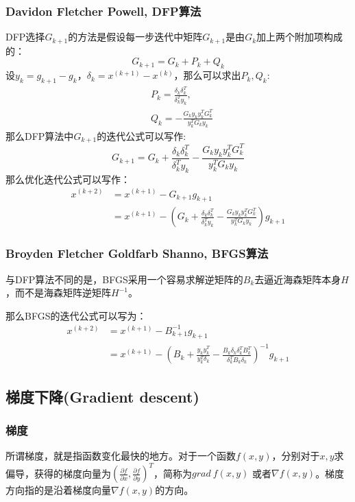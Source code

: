 \documentclass[11pt]{report}
\begin{document}
\subsubsection{Davidon Fletcher Powell, DFP算法}
DFP选择$G_{k+1}$的方法是假设每一步迭代中矩阵$G_{k+1}$是由$G_k$加上两个附加项构成的：
\begin{equation}
	G_{k+1}=G_k+P_k+Q_k
\end{equation}
设$y_k=g_{k+1}-g_k$，$\delta_k=x^{(k+1)}-x^{(k)}$，那么可以求出$P_k,Q_k$:
\begin{equation}
	\begin{split}
		&P_k=\frac{\delta_k\delta_k^T}{\delta_k^T y_k},\\
		&Q_k=-\frac{G_ky_ky_k^TG_k^T}{y_k^TG_ky_k}
	\end{split}
\end{equation}
那么DFP算法中$G_{k+1}$的迭代公式可以写作:
\begin{equation}
	G_{k+1}=G_{k}+\frac{\delta_k\delta_k^T}{\delta_k^T y_k}-\frac{G_ky_ky_k^TG_k^T}{y_k^TG_ky_k}
\end{equation}
那么优化迭代公式可以写作：
\begin{equation}
	\begin{split}
		x^{(k+2)}&=x^{(k+1)}-G_{k+1}g_{k+1}\\
		&=x^{(k+1)}-\left(G_{k}+\frac{\delta_k\delta_k^T}{\delta_k^T y_k}-\frac{G_ky_ky_k^TG_k^T}{y_k^TG_ky_k}\right)g_{k+1}
	\end{split}
\end{equation}
\subsubsection{Broyden Fletcher Goldfarb Shanno, BFGS算法}
与DFP算法不同的是，BFGS采用一个容易求解逆矩阵的$B_k$去逼近海森矩阵本身$H$，而不是海森矩阵逆矩阵$H^{-1}$。
\par
那么BFGS的迭代公式可以写为：
\begin{equation}
	\begin{split}
		x^{(k+2)}&=x^{(k+1)}-B_{k+1}^{-1}g_{k+1}\\
		&=x^{(k+1)}-\left(B_{k}+\frac{y_ky_k^T}{y_k^T \delta_k}-\frac{B_k\delta_k\delta_k^TB_k^T}{\delta_k^TB_k\delta_k}\right)^{-1}g_{k+1}
	\end{split}
\end{equation}
\subsection{梯度下降(Gradient descent)}
\subsubsection{梯度}
所谓梯度，就是指函数变化最快的地方。对于一个函数$f(x,y)$，分别对于$x,y$求偏导，获得的梯度向量为$(\frac{\partial f}{\partial x},\frac{\partial f}{\partial y})^T$，简称为$grad\ f(x,y)$ 或者$\nabla f(x,y)$。梯度方向指的是沿着梯度向量$\nabla f(x,y)$的方向。
\end{document}
